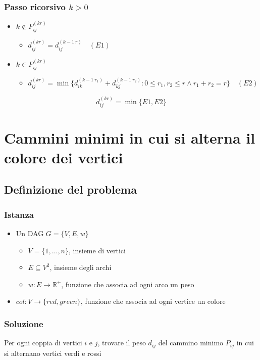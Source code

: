 \subsubsection{Passo ricorsivo $k>0$}
\begin{itemize}
    \item $k \not \in P_{ij}^{(kr)}$
    \begin{itemize}
        \item $d_{ij}^{(kr)} = d_{ij}^{(k-1\ r)} \quad (E1)$
    \end{itemize}
    \item $k \in P_{ij}^{(kr)}$
    \begin{itemize}
        \item $d_{ij}^{(kr)} = \min\{d_{ik}^{(k-1\ r_1)} + d_{kj}^{(k-1 \ r_2)} : 0 \leq r_1, r_2 \leq r \land r_1 + r_2 = r\} \quad (E2)$ 
    \end{itemize}
\end{itemize}

{
    \large

    $$
        d_{ij}^{(kr)} = \min\{E1,E2\}
    $$
}

\newpage
\section{Cammini minimi in cui si alterna il colore dei vertici}

\subsection{Definizione del problema}
\subsubsection{Istanza}
\begin{itemize}
    \item Un DAG $G=\{V,E,w\}$
    \begin{itemize}
        \item $V = \{1,\dots,n\}$, insieme di vertici
        \item $E \subseteq V^2$, insieme degli archi
        \item $w:E \to \mathbb{R}^+$, funzione che associa ad ogni arco un peso
    \end{itemize}
    \item $col: V \to \{red, green\}$, funzione che associa ad ogni vertice un colore
\end{itemize}

\subsubsection{Soluzione}
Per ogni coppia di vertici $i$ e $j$, trovare il peso $d_{ij}$ del cammino minimo $P_{ij}$ in cui si alternano vertici verdi e rossi


